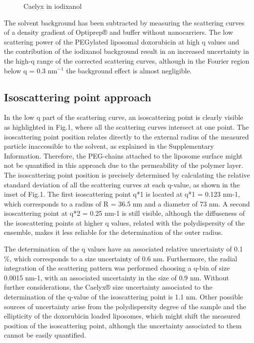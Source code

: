 \begin{figure}
	\centering
		\caption{Caelyx in iodixanol}
\end{figure}

The solvent background has been subtracted by measuring the scattering curves of a density gradient of Optiprep® and buffer without nanocarriers. The low scattering power of the PEGylated liposomal doxorubicin at high q values and the contribution of the iodixanol background  result in an increased uncertainty in the high-q range of the corrected scattering curves, although in the Fourier region below q = 0.3 nm$^{-1}$ the background effect is almost negligible.

\subsection{Isoscattering point approach}
In the low q part of the scattering curve, an isoscattering point is clearly visible as highlighted in Fig.1, where all the scattering curves intersect at one point. The isoscattering point position relates directly to the external radius of the measured particle inaccessible to the solvent, as explained in the Supplementary Information. Therefore, the PEG-chains attached to the liposome surface might not be quantified in this approach due to the permeability of the polymer layer. The isoscattering point position is precisely determined by calculating the relative standard deviation of all the scattering curves at each q-value, as shown in the inset of Fig.1. The first isoscattering point q*1 is located at q*1 = 0.123 nm-1, which corresponds to a radius of R = 36.5 nm and a diameter of 73 nm. A second isoscattering point at q*2 = 0.25 nm-1 is still visible, although the diffuseness of the isoscattering points at higher q values, related with the polydispersity of the ensemble, makes it less reliable for the determination of the outer radius.

The determination of the q values have an associated relative uncertainty of 0.1 $\%$, which corresponds to a size uncertainty of 0.6 nm. Furthermore, the radial integration of the scattering pattern was performed choosing a q-bin of size 0.0015 nm-1, with an associated uncertainty in the size of 0.9 nm. Without further considerations, the Caelyx® size uncertainty associated to the determination of the q-value of the isoscattering point is 1.1 nm. Other possible sources of uncertainty arise from the polydispersity degree of the sample and the ellipticity of the doxorubicin loaded liposomes, which might shift the measured position of the isoscattering point, although the uncertainty associated to them cannot be easily quantified. 


